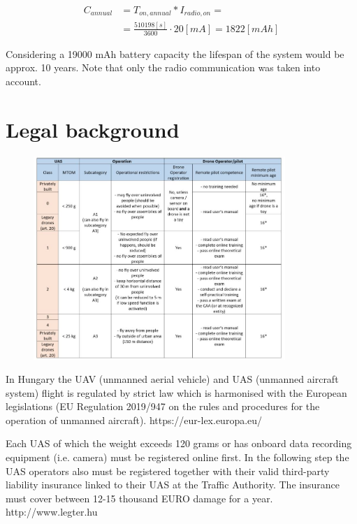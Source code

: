 \documentclass[conference]{IEEEtran}
\begin{document}
\begin{align}
    C_{annual} &= T_{on,annual} * I_{radio,on} = \\
     &= \frac{510198 [s]}{3600} \cdot 20 [mA] = 1822 [mAh]
\end{align}

Considering a 19000 mAh battery capacity the lifespan of the system would
be approx. 10 years. Note that only the radio communication was taken into account.

\section{Legal background}

\begin{figure}[t]
	\centering
	\includegraphics[width=0.85\textwidth]{fig/legal.png}
  \caption{}
	\label{fig-piggyback}
\end{figure}

In Hungary the UAV (unmanned aerial vehicle) and UAS (unmanned aircraft system)
flight is regulated by strict law which is harmonised with the European
legislations (EU Regulation 2019/947 on the rules and procedures for the
operation of unmanned aircraft). https://eur-lex.europa.eu/

Each UAS of which the weight exceeds 120 grams or has onboard data recording
equipment (i.e. camera) must be registered online first. In the following step
the UAS operators also must be registered together with their valid third-party
liability insurance linked to their UAS at the Traffic Authority. The insurance
must cover between 12-15 thousand EURO damage for a year. http://www.legter.hu
\end{document}
